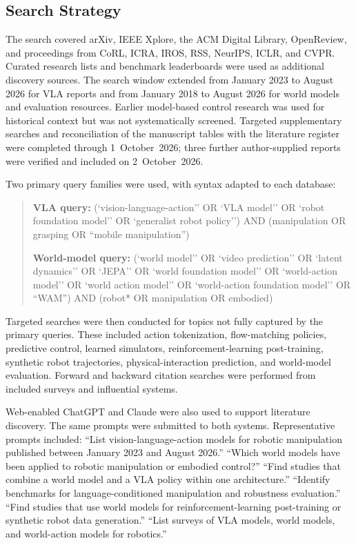 \documentclass{ieeeaccess}
\begin{document}
\subsection{Search Strategy}
\label{sec:search}

The search covered arXiv, IEEE Xplore, the ACM Digital Library, OpenReview, and proceedings from CoRL, ICRA, IROS, RSS, NeurIPS, ICLR, and CVPR. Curated research lists and benchmark leaderboards were used as additional discovery sources. The search window extended from January 2023 to August 2026 for VLA reports and from January 2018 to August 2026 for world models and evaluation resources. Earlier model-based control research was used for historical context but was not systematically screened. \textcolor[RGB]{104,48,148}{Targeted supplementary searches and reconciliation of the manuscript tables with the literature register were completed through 1~October~2026; three further author-supplied reports were verified and included on 2~October~2026.}

Two primary query families were used, with syntax adapted to each database:

\begin{quote}
\small
\textbf{VLA query:} (`vision-language-action'' OR `VLA model'' OR `robot foundation model'' OR `generalist robot policy'') AND (manipulation OR grasping OR ``mobile manipulation'')

\textbf{World-model query:} (`world model'' OR `video prediction'' OR `latent dynamics'' OR `JEPA'' OR `world foundation model'' OR `world-action model'' OR `world action model'' OR `world-action foundation model'' OR ``WAM'') AND (robot* OR manipulation OR embodied)
\end{quote}

Targeted searches were then conducted for topics not fully captured by the primary queries. These included action tokenization, flow-matching policies, predictive control, learned simulators, reinforcement-learning post-training, synthetic robot trajectories, physical-interaction prediction, and world-model evaluation. Forward and backward citation searches were performed from included surveys and influential systems.

Web-enabled ChatGPT and Claude were also used to support literature discovery. The same prompts were submitted to both systems. Representative prompts included:
 ``List vision-language-action models for robotic manipulation published between January 2023 and August 2026.''
``Which world models have been applied to robotic manipulation or embodied control?''
``Find studies that combine a world model and a VLA policy within one architecture.''
``Identify benchmarks for language-conditioned manipulation and robustness evaluation.''
``Find studies that use world models for reinforcement-learning post-training or synthetic robot data generation.''
``List surveys of VLA models, world models, and world-action models for robotics.''
\end{document}
